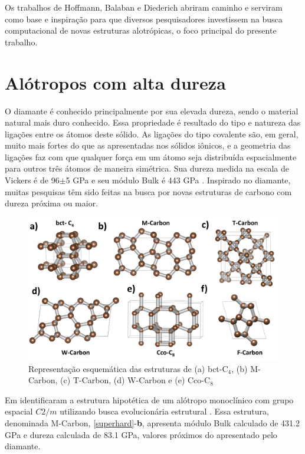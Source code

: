 		Os trabalhos de Hoffmann, Balaban e Diederich abriram caminho e serviram como base e inspiração para que diversos pesquisadores investissem na busca computacional de novas estruturas alotrópicas, o foco principal do presente trabalho.
	
	\section{Alótropos com alta dureza}
	
		O diamante é conhecido principalmente por sua elevada dureza, sendo o material natural mais duro conhecido. Essa propriedade é resultado do tipo e natureza das ligações entre os átomos deste sólido. As ligações do tipo covalente são, em geral, muito mais fortes do que as apresentadas nos sólidos iônicos, e a geometria das ligações faz com que qualquer força em um átomo seja distribuída espacialmente para outros três átomos de maneira simétrica. Sua dureza medida na escala de Vickers é de 96$\pm$5 GPa e seu módulo Bulk é 443 GPa \cite{andrievski2001superhard}.  Inspirado no diamante, muitas pesquisas têm sido feitas na busca por novas estruturas de carbono com dureza próxima ou maior. 
				
		\begin{figure}[!h]
			\centering
			\includegraphics[width=.7\linewidth]{capitulos/fig/intro/superhard}
			\caption{Representação esquemática das estruturas de (a) bct-C$_4$, (b) M-Carbon, (c) T-Carbon, (d) W-Carbon e (e) Cco-C$_8$}
			\label{superhard}
		\end{figure}
	
		Em \citeyear{li2009superhard} \citeauthor{li2009superhard} identificaram a estrutura hipotética de um alótropo monoclínico com grupo espacial $C2/m$ utilizando busca evolucionária estrutural \cite{oganov2006crystal}. Essa estrutura, denominada M-Carbon, \autoref{superhard}-\textbf{b}, apresenta módulo Bulk calculado de 431.2 GPa e dureza calculada de 83.1 GPa, valores próximos do apresentado pelo diamante. 
		
